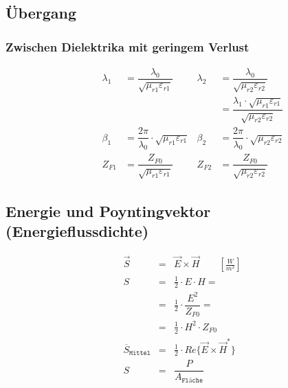 \subsection{Übergang}
\subsubsection{Zwischen Dielektrika mit geringem Verlust}


\begin{align*}
    \quad \qquad \lambda_1 & = \dfrac{\lambda_0}{\sqrt{\mu_{r1}\varepsilon_{r1}}}          & \lambda_2 & = \dfrac{\lambda_0}{\sqrt{\mu_{r2}\varepsilon_{r2}}}                                     \\
    \quad \qquad           &                                                               &           & = \dfrac{\lambda_1\cdot\sqrt{\mu_{r1}\varepsilon_{r1}}}{\sqrt{\mu_{r2}\varepsilon_{r2}}} \\
    \quad \qquad \beta_1   & = \dfrac{2\pi}{\lambda_0}\cdot\sqrt{\mu_{r1}\varepsilon_{r1}} & \beta_2   & = \dfrac{2\pi}{\lambda_0}\cdot\sqrt{\mu_{r2}\varepsilon_{r2}}                            \\
    \quad \qquad Z_{F1}    & = \dfrac{Z_{F0}}{\sqrt{\mu_{r1}\varepsilon_{r1}}}             & Z_{F2}    & = \dfrac{Z_{F0}}{\sqrt{\mu_{r2}\varepsilon_{r2}}}
\end{align*}

\subsection{Energie und Poyntingvektor (Energieflussdichte)}
\begin{align*}
     & \vec{S}                        & = & \vec{E}\times\vec{H} \qquad \si{\left[\frac{W}{m^2}\right]} \\
     & S                              & = & \frac{1}{2} \cdot E \cdot H =                               \\
     &                                & = & \frac{1}{2} \cdot \dfrac{E^2}{Z_{F0}} =                     \\
     &                                & = & \frac{1}{2} \cdot H^2 \cdot Z_{F0}                          \\
     & \overline{S}_{\texttt{Mittel}} & = & \frac{1}{2} \cdot Re\{\vec{E}\times\vec{H}^*\}              \\
     & S                              & = & \dfrac{P}{A_\texttt{Fläche}}                                \\
\end{align*}

